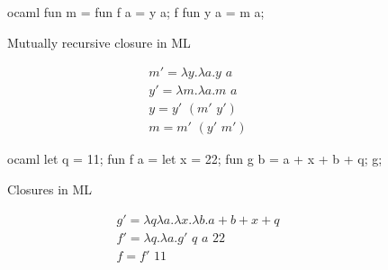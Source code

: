 \documentclass[11pt]{article}
\begin{document}
    \begin{figure}[htp]
        \centering
        \begin{cminted}{ocaml}
fun m =
    fun f a = y a;
    f
fun y a = m a;
        \end{cminted}
        \caption{Mutually recursive closure in ML}
        \label{lst:mutually_recursive_curried}
    \end{figure}
    \begin{gather}
        m' = \lambda y. \lambda a. y \,\, a \nonumber \\
        y' = \lambda m. \lambda a. m \,\, a \nonumber \\
        y = y' \,\, (m' \,\, y') \nonumber \\
        m = m' \,\, (y' \,\, m')
    \end{gather}
    \begin{figure}[htp]
        \centering
        \begin{cminted}{ocaml}
let q = 11;
fun f a =
    let x = 22;
    fun g b = a + x + b + q;
    g;
        \end{cminted}
        \caption{Closures in ML}
        \label{lst:closures}
    \end{figure}
    \begin{gather}
        g' = \lambda q \lambda a. \lambda x. \lambda b. a + b + x + q \nonumber \\
        f' = \lambda q. \lambda a. g' \,\, q \,\, a \,\, 22 \nonumber \\
        f = f' \,\, 11
    \end{gather}
\end{document}
